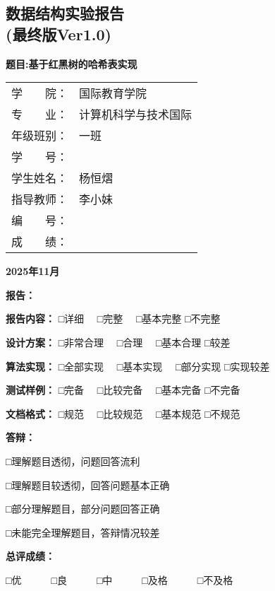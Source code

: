\documentclass[12pt,a4paper]{article}
\begin{document}
\begin{center}

\section*{\textbf{\fontsize{26pt}{30pt}\selectfont 数据结构实验报告\\(最终版Ver1.0)}}
\label{sec:data_structure_lab_report}
\vspace{0.5cm}
\textbf{\fontsize{22pt}{26pt}\selectfont 题目:基于红黑树的哈希表实现}

\vspace{2cm}
\begin{tabular}{ll}
\fontsize{16pt}{19pt}\selectfont 学　　院： & \fontsize{16pt}{19pt}\selectfont 国际教育学院\\
\fontsize{16pt}{19pt}\selectfont 专　　业： & \fontsize{16pt}{19pt}\selectfont 计算机科学与技术国际\\
\fontsize{16pt}{19pt}\selectfont 年级班别： & \fontsize{16pt}{19pt}\selectfont 一班\\
\fontsize{16pt}{19pt}\selectfont 学　　号： & \fontsize{16pt}{19pt}\selectfont 3124009862\\
\fontsize{16pt}{19pt}\selectfont 学生姓名： & \fontsize{16pt}{19pt}\selectfont 杨恒熠\\
\fontsize{16pt}{19pt}\selectfont 指导教师： & \fontsize{16pt}{19pt}\selectfont 李小妹\\
\fontsize{16pt}{19pt}\selectfont 编　　号： & \fontsize{16pt}{19pt}\selectfont \dotfill\\
\fontsize{16pt}{19pt}\selectfont 成　　绩： & \fontsize{16pt}{19pt}\selectfont \dotfill\\
\end{tabular}
\vfill
\textbf{2025年11月}
\end{center}

\newpage
\begin{center}
\textbf{报告：}

\textbf{报告内容：} □详细　 □完整　 □基本完整 □不完整

\textbf{设计方案：} □非常合理　 □合理　 □基本合理 □较差

\textbf{算法实现：} □全部实现　 □基本实现　 □部分实现 □实现较差

\textbf{测试样例：} □完备　 □比较完备　 □基本完备 □不完备

\textbf{文档格式：} □规范　 □比较规范　 □基本规范 □不规范

\vspace{1cm}
\textbf{答辩：}

□理解题目透彻，问题回答流利

□理解题目较透彻，回答问题基本正确

□部分理解题目，部分问题回答正确

□未能完全理解题目，答辩情况较差

\vspace{1cm}
\textbf{总评成绩：}

□优　　　□良　　　□中　　　□及格　　　□不及格
\end{center}
\end{document}

